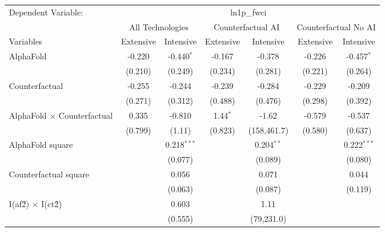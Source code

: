 \begingroup
\centering
\begin{tabular}{lcccccc}
   \tabularnewline \midrule \midrule
   Dependent Variable: & \multicolumn{6}{c}{ln1p\_fwci}\\
 & \multicolumn{2}{c}{All Technologies} & \multicolumn{2}{c}{Counterfactual AI} & \multicolumn{2}{c}{Counterfactual No AI} \\
\cmidrule(lr){1-1}\cmidrule(lr){2-3} \cmidrule(lr){4-5} \cmidrule(lr){6-7}
Variables & \multicolumn{1}{c}{Extensive} & \multicolumn{1}{c}{Intensive} & \multicolumn{1}{c}{Extensive} & \multicolumn{1}{c}{Intensive} & \multicolumn{1}{c}{Extensive} & \multicolumn{1}{c}{Intensive} \\
\cmidrule(lr){1-1}\cmidrule(lr){2-2} \cmidrule(lr){3-3} \cmidrule(lr){4-4} \cmidrule(lr){5-5} \cmidrule(lr){6-6} \cmidrule(lr){7-7}
   AlphaFold                          & -0.220  & -0.440$^{*}$  & -0.167     & -0.378       & -0.226  & -0.457$^{*}$\\   
                                      & (0.210) & (0.249)       & (0.234)    & (0.281)      & (0.221) & (0.264)\\   
   Counterfactual                     & -0.255  & -0.244        & -0.239     & -0.284       & -0.229  & -0.209\\   
                                      & (0.271) & (0.312)       & (0.488)    & (0.476)      & (0.298) & (0.392)\\   
   AlphaFold $\times$ Counterfactual  & 0.335   & -0.810        & 1.44$^{*}$ & -1.62        & -0.579  & -0.537\\   
                                      & (0.799) & (1.11)        & (0.823)    & (158,461.7)  & (0.580) & (0.637)\\   
   AlphaFold square                   &         & 0.218$^{***}$ &            & 0.204$^{**}$ &         & 0.222$^{***}$\\   
                                      &         & (0.077)       &            & (0.089)      &         & (0.080)\\   
   Counterfactual square              &         & 0.056         &            & 0.071        &         & 0.044\\   
                                      &         & (0.063)       &            & (0.087)      &         & (0.119)\\   
   I(af\^2) $\times$ I(ct\^2)         &         & 0.603         &            & 1.11         &         &   \\   
                                      &         & (0.555)       &            & (79,231.0)   &         &   \\   

\end{tabular}
